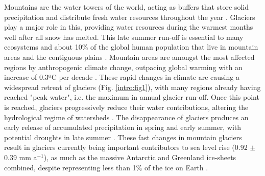 Mountains are the water towers of the world, acting as buffers that store solid precipitation and distribute fresh water resources throughout the year \citep{immerzeel_importance_2020}. Glaciers play a major role in this, providing water resources during the warmest months well after all snow has melted. This late summer run-off is essential to many ecosystems and about 10\% of the global human population that live in mountain areas and the contiguous plains \citep{huss_global-scale_2018, cauvy-fraunie_global_2019,farinotti_large_2019}. Mountain areas are amongst the most affected regions by anthropogenic climate change, outpacing global warming  with an increase of 0.3ºC per decade \cite{ipcc_climate_2018}. These rapid changes in climate are causing a widespread retreat of glaciers (Fig. \ref{intro:fig1}), with many regions already having reached "peak water", i.e. the maximum in annual glacier run-off. Once this point is reached, glaciers progressively reduce their water contributions, altering the hydrological regime of watersheds \citep{huss_global-scale_2018}. The disappearance of glaciers produces an early release of accumulated precipitation in spring and early summer, with potential droughts in late summer \citep{brunner_future_2019}. These fast changes in mountain glaciers result in glaciers currently being important contributors to sea level rise (0.92 $\pm$ 0.39 mm a$^{-1}$), as much as the massive Antarctic and Greenland ice-sheets combined, despite representing less than 1\% of the ice on Earth \citep{zemp_global_2019, hock_glaciermip_2019}. 

